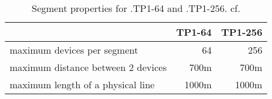 \begin{table}
	\centering
	\begin{tabular}{l r r }
		& \textbf{TP1-64} & \textbf{TP1-256} \\\toprule
		maximum devices per segment & 64 & 256 \\
		maximum distance between 2 devices & 700m & 700m \\
		maximum length of a physical line & 1000m & 1000m \\
		\bottomrule
	\end{tabular}
	\caption[Segment properties for \knx.TP1-64 and \knx.TP1-256]{Segment properties for \knx.TP1-64 and \knx.TP1-256. cf. \textcite{Sokollik2017} }
	\label{tab:background:bas:knx:topo:tpsegments}
\end{table}